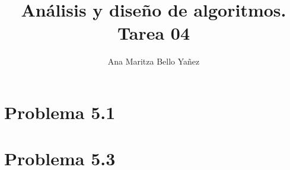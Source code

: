 \documentclass{article}
\begin{document}
\title{Análisis y diseño de algoritmos. \\ Tarea 04}
\author{Ana Maritza Bello Yañez}
\maketitle
\setlength{\parindent}{0pt}
\setlength{\parskip}{1em}

\section*{Problema 5.1}


\section*{Problema 5.3}

\end{document}
